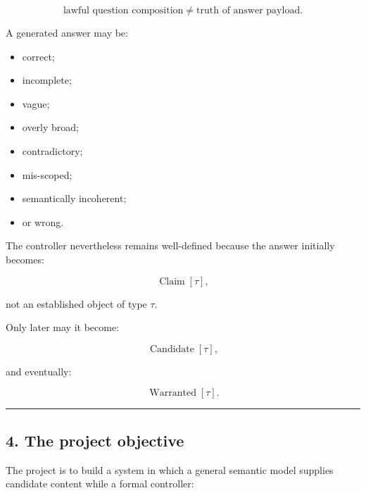 \documentclass[
]{article}
\providecommand{\tightlist}{%
  \setlength{\itemsep}{0pt}\setlength{\parskip}{0pt}}
\begin{document}
\[
\boxed{
\text{lawful question composition}
\neq
\text{truth of answer payload}.
}
\]

A generated answer may be:

\begin{itemize}
\tightlist
\item
  correct;
\item
  incomplete;
\item
  vague;
\item
  overly broad;
\item
  contradictory;
\item
  mis-scoped;
\item
  semantically incoherent;
\item
  or wrong.
\end{itemize}

The controller nevertheless remains well-defined because the answer
initially becomes:

\[
\operatorname{Claim}[\tau],
\]

not an established object of type \(\tau\).

Only later may it become:

\[
\operatorname{Candidate}[\tau],
\]

and eventually:

\[
\operatorname{Warranted}[\tau].
\]

\begin{center}\rule{0.5\linewidth}{0.5pt}\end{center}

\subsection{4. The project objective}\label{the-project-objective}

The project is to build a system in which a general semantic model
supplies candidate content while a formal controller:
\end{document}
